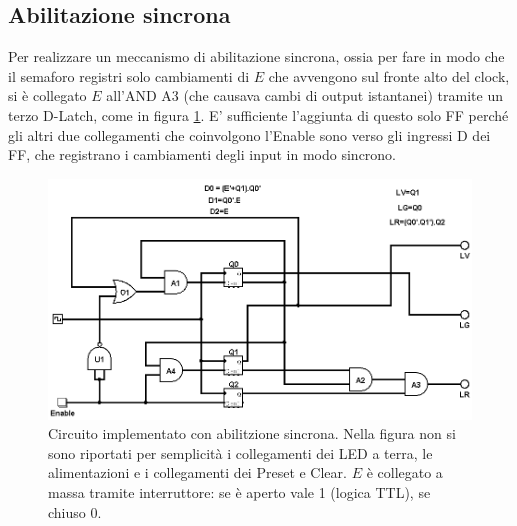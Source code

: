 \documentclass[10pt,a4paper]{article}
\begin{document}
\subsection{Abilitazione sincrona}
Per realizzare un meccanismo di abilitazione sincrona, ossia per fare in modo che il semaforo registri solo cambiamenti di $E$ che avvengono sul fronte alto del clock, si è collegato $E$ all'AND A3 (che causava cambi di output istantanei) tramite un terzo D-Latch, come in figura \ref{fig:circcompletesincrono}.
E' sufficiente l'aggiunta di questo solo FF perché gli altri due collegamenti che coinvolgono l'Enable sono verso gli ingressi D dei FF, che registrano i cambiamenti degli input in modo sincrono.
\begin{figure}[!htb]
\centering
\includegraphics[scale=0.5]{circcompletesincrono.png}
\caption{Circuito implementato con abilitzione sincrona. Nella figura non si sono riportati per semplicità i collegamenti dei LED a terra, le alimentazioni e i collegamenti dei Preset e Clear. $E$ è collegato a massa tramite interruttore: se è aperto vale 1 (logica TTL), se chiuso 0.\label{fig:circcompletesincrono}}
\end{figure}

\end{document}

